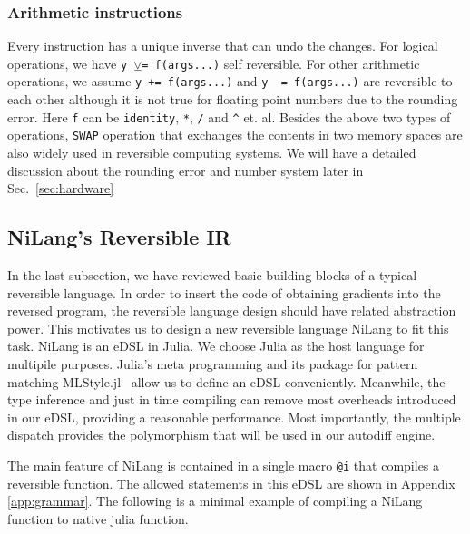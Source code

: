 \documentclass[aps,twocolumn,longbibliography,english,superscriptaddress]{revtex4-1}
\newcommand{\<}{\langle}
\renewcommand{\>}{\rangle}
\newcommand{\Sec}[1]{Sec.~\ref{#1}}
\newcommand{\App}[1]{Appendix \ref{#1}}
\theoremstyle{definition}\newtheorem{definition}{\textit{Definition}}
\begin{document}
\subsubsection{Arithmetic instructions}
Every instruction has a unique inverse that can undo the changes.
For logical operations, we have \texttt{y $\veebar$= f(args...)} self reversible.
For other arithmetic operations, we assume \texttt{y += f(args...)} and \texttt{y -= f(args...)} are reversible to each other although it is not true for floating point numbers due to the rounding error. Here \texttt{f} can be \texttt{identity}, \texttt{*}, \texttt{/} and \texttt{\^} et. al.
Besides the above two types of operations, \texttt{SWAP} operation that exchanges the contents in two memory spaces are also widely used in reversible computing systems.
We will have a detailed discussion about the rounding error and number system later in \Sec{sec:hardware}

\subsection{NiLang's Reversible IR}
In the last subsection, we have reviewed basic building blocks of a typical reversible language. In order to insert the code of obtaining gradients into the reversed program, the reversible language design should have related abstraction power.
This motivates us to design a new reversible language NiLang to fit this task.
NiLang is an eDSL in Julia. We choose Julia as the host language for multipile purposes. Julia's meta programming and its package for pattern matching MLStyle.jl~\cite{MLStyle} allow us to define an eDSL conveniently. Meanwhile, the type inference and just in time compiling can remove most overheads introduced in our eDSL, providing a reasonable performance. Most importantly, the multiple dispatch provides the polymorphism that will be used in our autodiff engine.

The main feature of NiLang is contained in a single macro \texttt{@i} that compiles a reversible function.
The allowed statements in this eDSL are shown in \App{app:grammar}.
The following is a minimal example of compiling a NiLang function to native julia function.
\end{document}
